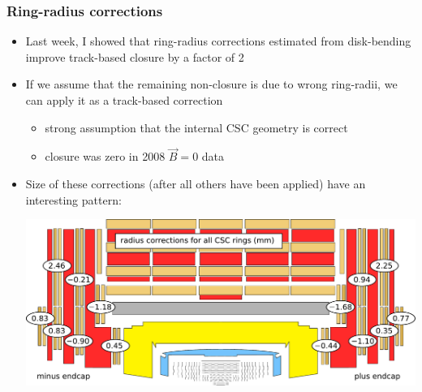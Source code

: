 \documentclass[compress]{beamer}
\begin{document}
\begin{frame}
\frametitle{Ring-radius corrections}

\begin{itemize}
\item Last week, I showed that ring-radius corrections estimated from
  disk-bending improve track-based closure by a factor of 2

\item If we assume that the remaining non-closure is due to wrong
  ring-radii, we can apply it as a track-based correction
\begin{itemize}
\item strong assumption that the internal CSC geometry is correct
\item closure was zero in 2008 $\vec{B}=0$ data
\end{itemize}

\item Size of these corrections (after all others have been applied)
  have an interesting pattern:
\begin{center}
\includegraphics[width=0.8\linewidth]{radial_corrections.pdf}
\end{center}
\end{itemize}
\end{frame}
\end{document}
